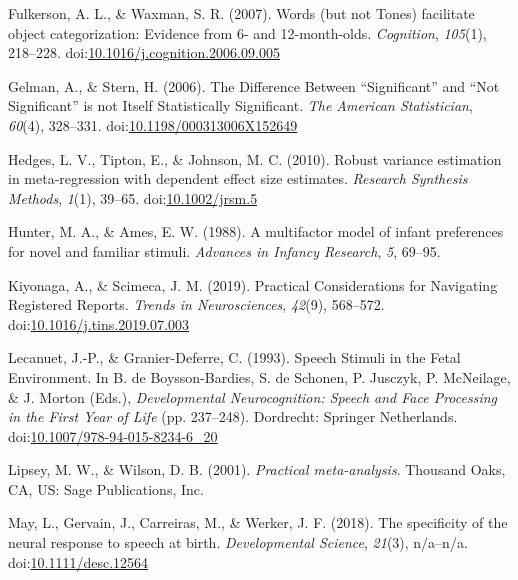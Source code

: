 \documentclass[man]{apa6}
\begin{document}
\hypertarget{ref-fulkerson_words_2007}{}
Fulkerson, A. L., \& Waxman, S. R. (2007). Words (but not Tones)
facilitate object categorization: Evidence from 6- and 12-month-olds.
\emph{Cognition}, \emph{105}(1), 218--228.
doi:\href{https://doi.org/10.1016/j.cognition.2006.09.005}{10.1016/j.cognition.2006.09.005}

\hypertarget{ref-gelman_difference_2006}{}
Gelman, A., \& Stern, H. (2006). The Difference Between ``Significant''
and ``Not Significant'' is not Itself Statistically Significant.
\emph{The American Statistician}, \emph{60}(4), 328--331.
doi:\href{https://doi.org/10.1198/000313006X152649}{10.1198/000313006X152649}

\hypertarget{ref-hedges_robust_2010}{}
Hedges, L. V., Tipton, E., \& Johnson, M. C. (2010). Robust variance
estimation in meta-regression with dependent effect size estimates.
\emph{Research Synthesis Methods}, \emph{1}(1), 39--65.
doi:\href{https://doi.org/10.1002/jrsm.5}{10.1002/jrsm.5}

\hypertarget{ref-hunter_multifactor_1988}{}
Hunter, M. A., \& Ames, E. W. (1988). A multifactor model of infant
preferences for novel and familiar stimuli. \emph{Advances in Infancy
Research}, \emph{5}, 69--95.

\hypertarget{ref-kiyonaga_practical_2019}{}
Kiyonaga, A., \& Scimeca, J. M. (2019). Practical Considerations for
Navigating Registered Reports. \emph{Trends in Neurosciences},
\emph{42}(9), 568--572.
doi:\href{https://doi.org/10.1016/j.tins.2019.07.003}{10.1016/j.tins.2019.07.003}

\hypertarget{ref-lecanuet_speech_1993}{}
Lecanuet, J.-P., \& Granier-Deferre, C. (1993). Speech Stimuli in the
Fetal Environment. In B. de Boysson-Bardies, S. de Schonen, P. Jusczyk,
P. McNeilage, \& J. Morton (Eds.), \emph{Developmental Neurocognition:
Speech and Face Processing in the First Year of Life} (pp. 237--248).
Dordrecht: Springer Netherlands.
doi:\href{https://doi.org/10.1007/978-94-015-8234-6_20}{10.1007/978-94-015-8234-6\_20}

\hypertarget{ref-lipsey_practical_2001}{}
Lipsey, M. W., \& Wilson, D. B. (2001). \emph{Practical meta-analysis}.
Thousand Oaks, CA, US: Sage Publications, Inc.

\hypertarget{ref-may_specificity_2018}{}
May, L., Gervain, J., Carreiras, M., \& Werker, J. F. (2018). The
specificity of the neural response to speech at birth.
\emph{Developmental Science}, \emph{21}(3), n/a--n/a.
doi:\href{https://doi.org/10.1111/desc.12564}{10.1111/desc.12564}
\end{document}
